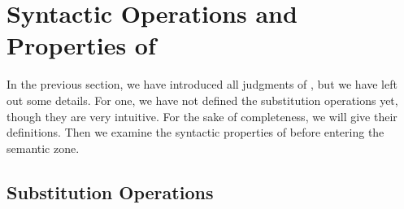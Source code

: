 \section{Syntactic Operations and Properties of \delamlang}

In the previous section, we have introduced all judgments of \delamlang, but we have
left out some details. %
For one, we have not defined the substitution operations yet, though they are very
intuitive. %
For the sake of completeness, we will give their definitions. %
Then we examine the syntactic properties of \delamlang before entering the semantic
zone. %

\subsection{Substitution Operations}

